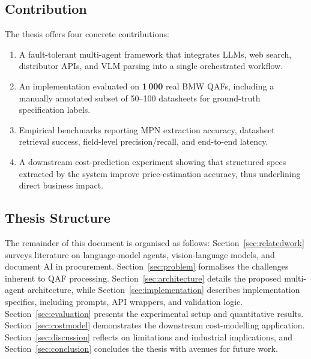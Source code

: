 \subsection{Contribution}
The thesis offers four concrete contributions:
\begin{enumerate}
  \item A fault-tolerant multi-agent framework that integrates LLMs, web search, distributor APIs, and VLM parsing into a single orchestrated workflow.  
  \item An implementation evaluated on \textbf{1\,000} real BMW QAFs, including a manually annotated subset of 50–100 datasheets for ground-truth specification labels.  
  \item Empirical benchmarks reporting MPN extraction accuracy, datasheet retrieval success, field-level precision/recall, and end-to-end latency.  
  \item A downstream cost-prediction experiment showing that structured specs extracted by the system improve price-estimation accuracy, thus underlining direct business impact.
\end{enumerate}

\subsection{Thesis Structure}
The remainder of this document is organised as follows:  
Section~\ref{sec:relatedwork} surveys literature on language-model agents, vision-language models, and document AI in procurement.  
Section~\ref{sec:problem} formalises the challenges inherent to QAF processing.  
Section~\ref{sec:architecture} details the proposed multi-agent architecture, while Section~\ref{sec:implementation} describes implementation specifics, including prompts, API wrappers, and validation logic.  
Section~\ref{sec:evaluation} presents the experimental setup and quantitative results.  
Section~\ref{sec:costmodel} demonstrates the downstream cost-modelling application.  
Section~\ref{sec:discussion} reflects on limitations and industrial implications, and Section~\ref{sec:conclusion} concludes the thesis with avenues for future work.
